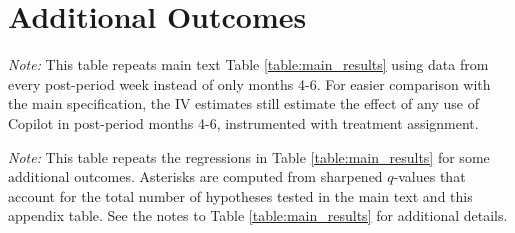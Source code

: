 \documentclass{article}
\newenvironment{tablenotes}{
    \begin{flushleft} \small
    \textit{Note:} 
}{
    \end{flushleft}
}
\begin{document}
\FloatBarrier

\clearpage
\setcounter{table}{0}
\setcounter{figure}{0}
\section{Additional Outcomes}

\begin{table}[htbp]
    \caption{Effects of Copilot in All Post-Period Weeks}
    
    \begin{tablenotes} This table repeats main text Table \ref{table:main_results} using data from every post-period week instead of only months 4-6. For easier comparison with the main specification, the IV estimates still estimate the effect of any use of Copilot in post-period months 4-6, instrumented with treatment assignment.
    \end{tablenotes}
    \label{table:all_months_iv}
\end{table}


\begin{table}[htbp]
  \caption{Effects of Copilot on Additional Outcome Measures} 
    \label{table:app_results}    
    \begin{tablenotes} This table repeats the regressions in Table \ref{table:main_results} for some additional outcomes. Asterisks are computed from sharpened $q$-values that account for the total number of hypotheses tested in the main text and this appendix table. See the notes to Table \ref{table:main_results} for additional details.
    \end{tablenotes}
\end{table}
\end{document}
